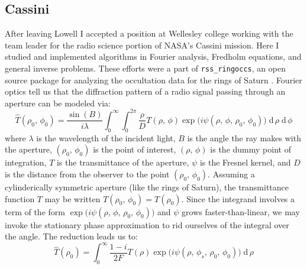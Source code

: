 \documentclass{article}
\theoremstyle{plain}
\begin{document}
        \subsection{Cassini}
            After leaving Lowell I accepted a position at Wellesley college
            working with the team leader for the radio science portion of NASA's
            Cassini mission. Here I studied and implemented algorithms in
            Fourier analysis, Fredholm equations, and general inverse problems.
            These efforts were a part of \texttt{rss\_ringoccs}, an open source
            package for analyzing the occultation data for the rings of Saturn
            \cite{rssringoccs}. Fourier optics tell us that the diffraction
            pattern of a radio signal passing through an aperture can be
            modeled via:
            \begin{equation}
                \hat{T}(\rho_{0},\,\phi_{0})=
                    \frac{\sin(B)}{i\lambda}
                    \int_{0}^{\infty}
                    \int_{0}^{2\pi}
                        \frac{\rho}{D}
                        T(\rho,\,\phi)
                        \exp\big(i\psi(\rho,\,\phi,\,\rho_{0},\,\phi_{0})\big)\;
                    \textrm{d}\,\rho\;
                    \textrm{d}\,\phi
            \end{equation}
            where $\lambda$ is the wavelength of the incident light, $B$ is
            the angle the ray makes with the aperture, $(\rho_{0},\,\phi_{0})$
            is the point of interest, $(\rho,\,\phi)$ is the dummy point of
            integration, $T$ is the transmittance of the aperture, $\psi$ is
            the Fresnel kernel, and $D$ is the distance from the observer to
            the point $(\rho_{0},\,\phi_{0})$. Assuming a cylinderically
            symmetric aperture (like the rings of Saturn),
            the transmittance function $T$ may be written
            $T(\rho_{0},\,\phi_{0})=T(\rho_{0})$. Since the integrand involves a
            term of the form
            $\exp\big(i\psi(\rho,\,\phi,\,\rho_{0},\,\phi_{0})\big)$ and
            $\psi$ grows faster-than-linear, we may
            invoke the stationary phase approximation to rid ourselves of the
            integral over the angle. The reduction leads us to:
            \begin{equation}
                \hat{T}(\rho_{0})=
                    \int_{0}^{\infty}
                        \frac{1-i}{2F}
                        T(\rho)
                        \exp\big(i\psi(\rho,\,\phi_{s},\,\rho_{0},\,\phi_{0})\big)\;
                    \textrm{d}\,\rho
            \end{equation}
\end{document}
